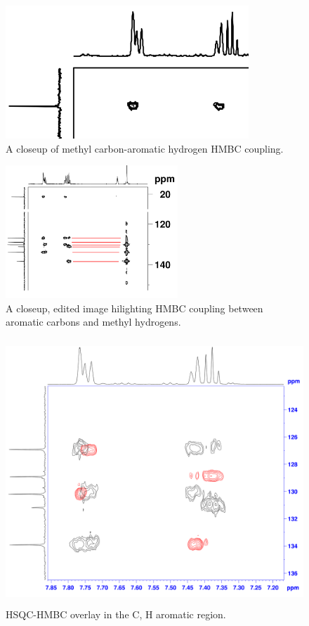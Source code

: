 \documentclass[8.5pt,twoside,twocolumn]{article}
\begin{document}
\begin{figure}[h]
\centering
  \includegraphics[height=5cm]{figures/HMBC-hydromethyl.png}
  \caption{A closeup of methyl carbon-aromatic hydrogen HMBC coupling.}
  \label{fig:hydromethyl}
\end{figure}

\begin{figure}[h]
\centering
  \includegraphics[height=5cm]{figures/hmbc-methylaromatic.png}
  \caption{A closeup, edited image hilighting HMBC coupling between aromatic carbons and methyl hydrogens.}
  \label{fig:methylaromatic}
\end{figure}

\begin{figure}
\centering
  \includegraphics[height=10cm]{figures/Overlay.png}
  \caption{HSQC-HMBC overlay in the C, H aromatic region.}
  \label{fig:overlay}
\end{figure}
\end{document}
